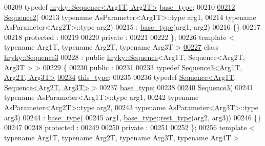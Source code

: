 \begin{DoxyCode}
00209     \textcolor{keyword}{typedef} \hyperlink{classhryky_1_1_sequence}{hryky::Sequence<Arg1T, Arg2T>}  \hyperlink{classhryky_1_1_sequence}{base_type};
00210 
\hypertarget{sequence_8h_source_l00212}{}\hyperlink{classhryky_1_1_sequence2_a01295f421c467db5698331fb474b3650}{00212}     \hyperlink{classhryky_1_1_sequence2_a01295f421c467db5698331fb474b3650}{Sequence2}(
00213         \textcolor{keyword}{typename} AsParameter<Arg1T>::type arg1,
00214         \textcolor{keyword}{typename} AsParameter<Arg2T>::type arg2)
00215         : \hyperlink{classhryky_1_1_sequence}{base_type}(arg1, arg2)
00216     \{\}
00217 
00218 \textcolor{keyword}{protected} :
00219 
00220 \textcolor{keyword}{private} :
00221 
00222 \};
00226 \textcolor{keyword}{template} < \textcolor{keyword}{typename} Arg1T, \textcolor{keyword}{typename} Arg2T, \textcolor{keyword}{typename} Arg3T >
\hypertarget{sequence_8h_source_l00227}{}\hyperlink{classhryky_1_1_sequence3}{00227} \textcolor{keyword}{class }\hyperlink{classhryky_1_1_sequence3}{hryky::Sequence3}
00228     : \textcolor{keyword}{public} \hyperlink{classhryky_1_1_sequence}{hryky::Sequence}<Arg1T, Sequence<Arg2T, Arg3T > >
00229 \{
00230 \textcolor{keyword}{public} :
00231 
00233     \textcolor{keyword}{typedef} \hyperlink{classhryky_1_1_sequence3}{Sequence3<Arg1T, Arg2T, Arg3T>}
\hypertarget{sequence_8h_source_l00234}{}\hyperlink{classhryky_1_1_sequence3_abf8d5757d430fa46f0569253fe17dc74}{00234}         \hyperlink{classhryky_1_1_sequence3_abf8d5757d430fa46f0569253fe17dc74}{this_type};
00235     
00236     \textcolor{keyword}{typedef} \hyperlink{classhryky_1_1_sequence}{Sequence<Arg1T, Sequence<Arg2T, Arg3T>} >
00237         \hyperlink{classhryky_1_1_sequence}{base_type};
00238 
\hypertarget{sequence_8h_source_l00240}{}\hyperlink{classhryky_1_1_sequence3_a90abb731407f77fd27ee683a325ac863}{00240}     \hyperlink{classhryky_1_1_sequence3_a90abb731407f77fd27ee683a325ac863}{Sequence3}(
00241         \textcolor{keyword}{typename} AsParameter<Arg1T>::type arg1,
00242         \textcolor{keyword}{typename} AsParameter<Arg2T>::type arg2,
00243         \textcolor{keyword}{typename} AsParameter<Arg3T>::type arg3)
00244         : \hyperlink{classhryky_1_1_sequence}{base_type}(
00245             arg1, \hyperlink{classhryky_1_1_sequence}{base_type}::\hyperlink{classhryky_1_1_sequence}{rest_type}(arg2, arg3))
00246     \{\}
00247 
00248 \textcolor{keyword}{protected} :
00249 
00250 \textcolor{keyword}{private} :
00251 
00252 \};
00256 \textcolor{keyword}{template} < \textcolor{keyword}{typename} Arg1T, \textcolor{keyword}{typename} Arg2T, \textcolor{keyword}{typename} Arg3T, \textcolor{keyword}{typename} Arg4T >

\end{DoxyCode}
